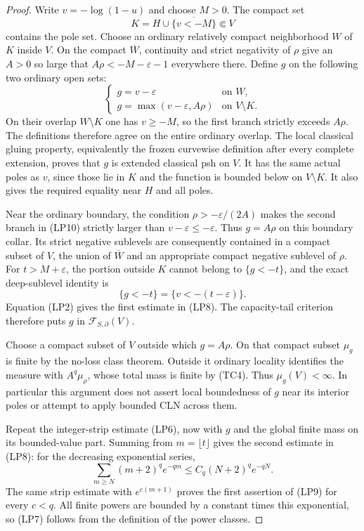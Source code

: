 \begin{proof}
Write $v=-\log(1-u)$ and choose $M>0$. The compact set
\[
                      K=H\cup\overline{\{v<-M\}}
                              \Subset V
\]
contains the pole set. Choose an ordinary relatively compact
neighborhood $W$ of $K$ inside $V$. On the compact
$\overline W$, continuity and strict negativity of $\rho$
give an $A>0$ so large that
$A\rho<-M-\varepsilon-1$ everywhere there.
Define $g$ on the following two ordinary open sets:
\[
 \begin{cases}
 g=v-\varepsilon&\text{on }W,\\
 g=\max(v-\varepsilon,A\rho)&\text{on }V\setminus K.
 \end{cases}
 \tag{LP10}
\]
On their overlap $W\setminus K$ one has $v\geq-M$,
so the first branch strictly exceeds $A\rho$.
The definitions therefore agree on the entire ordinary overlap.
The local classical gluing property, equivalently the frozen
curvewise definition after every complete extension, proves
that $g$ is extended classical psh on $V$.
It has the same actual poles as $v$, since those lie in $K$
and the function is bounded below on $V\setminus K$.
It also gives the required equality near $H$ and all poles.

Near the ordinary boundary, the condition
$\rho>-\varepsilon/(2A)$ makes the second branch in (LP10)
strictly larger than $v-\varepsilon\leq-\varepsilon$.
Thus $g=A\rho$ on this boundary collar. Its strict negative
sublevels are consequently contained in a compact subset of
$V$, the union of $\overline W$ and an appropriate compact
negative sublevel of $\rho$.
For $t>M+\varepsilon$, the portion outside $K$ cannot belong
to $\{g<-t\}$, and the exact deep-sublevel identity is
\[
                    \{g<-t\}=\{v<-(t-\varepsilon)\}.
 \tag{LP11}
\]
Equation (LP2) gives the first estimate in (LP8).
The capacity-tail criterion therefore puts $g$ in
$\mathcal F_{S,\partial}(V)$.

Choose a compact subset of $V$ outside which $g=A\rho$.
On that compact subset $\mu_g$ is finite by the no-loss
class theorem. Outside it ordinary locality identifies the
measure with $A^q\mu_\rho$, whose total mass is finite by
(TC4). Thus $\mu_g(V)<\infty$.
In particular this argument does not assert local boundedness
of $g$ near its interior poles or attempt to apply bounded
CLN across them.

Repeat the integer-strip estimate (LP6), now with $g$ and
the global finite mass on its bounded-value part. Summing
from $m=\lfloor t\rfloor$ gives the second estimate in
(LP8): for the decreasing exponential series,
\[
 \sum_{m\geq N}(m+2)^q e^{-qm}
                         \leq C_q(N+2)^q e^{-qN}.
\]
The same strip estimate with $e^{c(m+1)}$ proves the first
assertion of (LP9) for every $c<q$. All finite powers are
bounded by a constant times this exponential, so (LP7)
follows from the definition of the power classes.


\end{proof}
